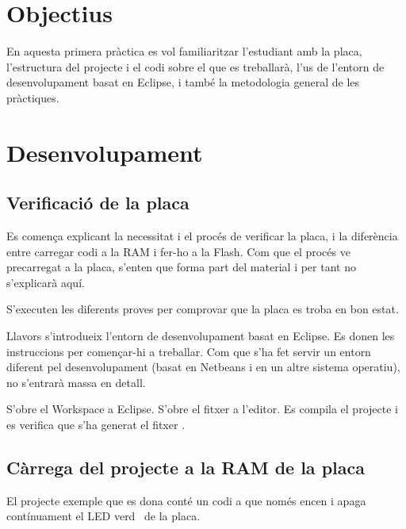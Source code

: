 
\section{Objectius}

En aquesta primera pràctica es vol familiaritzar l'estudiant amb la placa,
l'estructura del projecte i el codi sobre el que es treballarà, l'us de l'entorn de
desenvolupament basat en Eclipse, i també la metodologia general de les
pràctiques.

\section{Desenvolupament}


\subsection{Verificació de la placa}

Es comença explicant la necessitat i el procés de verificar la placa,
i la diferència entre carregar codi a la RAM i fer-ho a la Flash. Com que
el procés ve precarregat a la placa, s'enten que forma part del material i
per tant no s'explicarà aquí.

S'executen les diferents proves per comprovar que la placa es troba en bon estat.

Llavors s'introdueix l'entorn de desenvolupament basat en Eclipse. Es donen
les instruccions per començar-hi a treballar. Com que s'ha fet servir un entorn
diferent pel desenvolupament (basat en Netbeans i en un altre sistema operatiu),
no s'entrarà massa en detall.

S'obre el Workspace a Eclipse. S'obre el fitxer  a l'editor.
Es compila el projecte i es verifica que s'ha generat el fitxer .


\subsection{Càrrega del projecte a la RAM de la placa}

El projecte exemple que es dona conté un codi a  que només encen
i apaga contínuament el LED verd~ de la placa.

